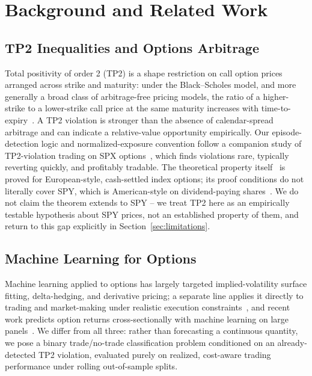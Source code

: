 \documentclass[sigconf,review]{acmart}
\begin{document}
\section{Background and Related Work}
\label{sec:related}

\subsection{TP2 Inequalities and Options Arbitrage}
Total positivity of order 2 (TP2) is a shape restriction on call option prices arranged across strike and maturity: under the Black--Scholes model, and more generally a broad class of arbitrage-free pricing models, the ratio of a higher-strike to a lower-strike call price at the same maturity increases with time-to-expiry~\cite{glasserman2026tp2theory,glasserman2023convexity}. A TP2 violation is stronger than the absence of calendar-spread arbitrage and can indicate a relative-value opportunity empirically. Our episode-detection logic and normalized-exposure convention follow a companion study of TP2-violation trading on SPX options~\cite{glasserman2025tp2}, which finds violations rare, typically reverting quickly, and profitably tradable. The theoretical property itself~\cite{glasserman2026tp2theory} is proved for European-style, cash-settled index options; its proof conditions do not literally cover SPY, which is American-style on dividend-paying shares~\cite{cosma2020earlyexercise}. We do not claim the theorem extends to SPY -- we treat TP2 here as an empirically testable hypothesis about SPY prices, not an established property of them, and return to this gap explicitly in Section~\ref{sec:limitations}.

\subsection{Machine Learning for Options}
Machine learning applied to options has largely targeted implied-volatility surface fitting, delta-hedging, and derivative pricing; a separate line applies it directly to trading and market-making under realistic execution constraints~\cite{kearns2013mlmicrostructure}, and recent work predicts option returns cross-sectionally with machine learning on large panels~\cite{bali2023option}. We differ from all three: rather than forecasting a continuous quantity, we pose a binary trade/no-trade classification problem conditioned on an already-detected TP2 violation, evaluated purely on realized, cost-aware trading performance under rolling out-of-sample splits.
\end{document}
